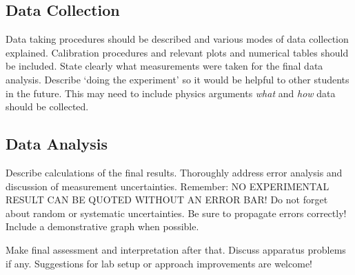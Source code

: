 \documentclass[10pt,letterpaper,onecolumn]{article}
\begin{document}
\subsection{Data Collection}

Data taking procedures should be described and various modes of
data collection explained. Calibration procedures and
relevant plots and numerical tables should be included.
State clearly what measurements were taken for the final
data analysis. Describe `doing the experiment' so it would
be helpful to other students in the future. This may need
to include physics arguments {\em what } and {\em how } data should
be collected.


\subsection{Data Analysis}


Describe calculations of the final results.
Thoroughly address error analysis and discussion of measurement
uncertainties. Remember: NO EXPERIMENTAL RESULT CAN BE QUOTED
WITHOUT AN ERROR BAR! Do not forget about random or systematic
uncertainties. Be sure to propagate errors correctly!
Include a demonstrative graph when possible.


Make final assessment and interpretation after that.
Discuss apparatus problems if any. Suggestions for
lab setup or approach improvements are welcome!



\begin{figure}[ht]
 \begin{center}
 \end{center}
\end{figure}


%
%
\end{document}
